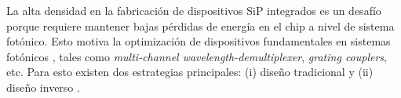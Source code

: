 La alta densidad en la fabricación de dispositivos SiP integrados es un desafío porque requiere mantener bajas pérdidas de energía en el chip a nivel de sistema fotónico. Esto motiva la optimización de dispositivos fundamentales en sistemas fotónicos \citep{Vuckovic2019}, tales como 
 \emph{multi-channel wavelength-demultiplexer}, \emph{grating couplers}, etc.
Para esto existen dos estrategias principales: (i) diseño tradicional
\citep{Hughes2016, Song2008, Huang2018} y (ii) diseño inverso \citep{Malheiros-Silveira2020, Gregory2015, Su2020}.


\begin{figure}[ht]
  \centering
  \hfill


\end{figure}
